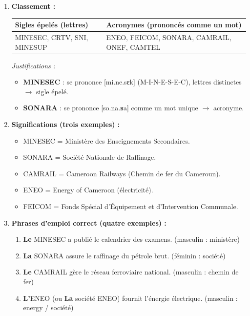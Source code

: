 \documentclass[11pt]{article}
\newcommand{\cle}[1]{{\popxbold\color{popdark}#1}}
\begin{document}
\begin{corrige}
\begin{enumerate}
\item \textbf{Classement :}
\begin{center}
\begin{tabularx}{\linewidth}{|l|X|}\hline
\textbf{Sigles épelés (lettres)} & \textbf{Acronymes (prononcés comme un mot)} \\ \hline
MINESEC, CRTV, SNI, MINESUP & ENEO, FEICOM, SONARA, CAMRAIL, ONEF, CAMTEL \\ \hline
\end{tabularx}
\end{center}
\textit{Justifications :}
\begin{itemize}
\item \textbf{MINESEC} : se prononce [mi.ne.sɛk] (M-I-N-E-S-E-C), lettres distinctes $\rightarrow$ sigle épelé.
\item \textbf{SONARA} : se prononce [so.na.ʁa] comme un mot unique $\rightarrow$ acronyme.
\end{itemize}
\item \textbf{Significations (trois exemples) :}
\begin{itemize}
\item \cle{MINESEC} = Ministère des Enseignements Secondaires.
\item \cle{SONARA} = Société Nationale de Raffinage.
\item \cle{CAMRAIL} = Cameroon Railways (Chemin de fer du Cameroun).
\item \cle{ENEO} = Energy of Cameroon (électricité).
\item \cle{FEICOM} = Fonds Spécial d'Équipement et d'Intervention Communale.
\end{itemize}
\item \textbf{Phrases d'emploi correct (quatre exemples) :}
\begin{enumerate}
\item \textbf{Le} MINESEC a publié le calendrier des examens. (masculin : ministère)
\item \textbf{La} SONARA assure le raffinage du pétrole brut. (féminin : société)
\item \textbf{Le} CAMRAIL gère le réseau ferroviaire national. (masculin : chemin de fer)
\item \textbf{L'}\cle{ENEO} (ou \textbf{La} société ENEO) fournit l'énergie électrique. (masculin : energy / société)
\end{enumerate}
\end{enumerate}
\end{corrige}
\end{document}
